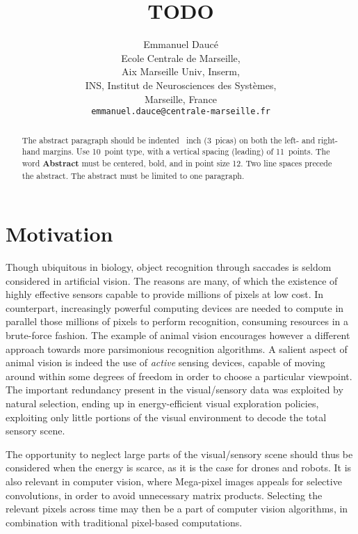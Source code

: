 \documentclass{article}
\title{TODO}
\author{
  Emmanuel Daucé\\
  Ecole Centrale de Marseille,\\ 
  Aix Marseille Univ, Inserm,\\ 
  INS, Institut de Neurosciences des Systèmes, \\
  Marseille, France\\
  \texttt{emmanuel.dauce@centrale-marseille.fr} \\
}
\begin{document}

\maketitle

\begin{abstract}
  The abstract paragraph should be indented ~inch
  (3~picas) on both the left- and right-hand margins. Use 10~point
  type, with a vertical spacing (leading) of 11~points.  The word
  \textbf{Abstract} must be centered, bold, and in point size 12. Two
  line spaces precede the abstract. The abstract must be limited to
  one paragraph.
\end{abstract}

\section{Motivation}

Though ubiquitous in biology, object recognition through saccades is seldom considered in artificial vision. The reasons are many, of which the existence of highly effective sensors capable to provide millions of pixels at low cost. %
In counterpart, increasingly powerful computing devices are needed to compute in parallel those millions of pixels to perform recognition, consuming resources in a brute-force fashion. 
The example of animal vision encourages however a different approach towards more parsimonious recognition algorithms. A salient aspect of animal vision is indeed the use of \emph{active} sensing devices, capable of moving around within some degrees of freedom in order to choose a particular viewpoint. The important redundancy present in the {\color{blue} visual/sensory} data was exploited by natural selection,  ending up in energy-efficient visual exploration policies, exploiting only little portions of the visual environment to decode the total sensory scene.

The opportunity to neglect large parts of the {\color{blue} visual/sensory} scene should thus be considered when the energy is scarce, as it is the case for drones and robots. 
It is also relevant in computer vision, where Mega-pixel images appeals for selective convolutions, in order to avoid unnecessary matrix products. 
Selecting the relevant pixels across time may then be a part of computer vision algorithms, in combination with traditional pixel-based computations. 
\end{document}
